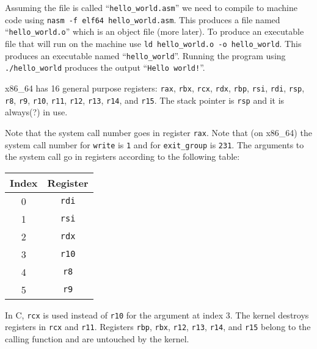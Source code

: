 \documentclass[12pt]{book}
\begin{document}
  Assuming the file is called ``\texttt{hello_world.asm}'' we need
  to compile to machine code using
  \texttt{nasm -f elf64 hello_world.asm}. This produces a file
  named ``\texttt{hello_world.o}'' which is an object file (more
  later). To produce an executable file that will run on the machine use
  \texttt{ld hello_world.o -o hello_world}. This produces an
  executable named ``\texttt{hello_world}''. Running the program
  using \texttt{./hello_world} produces the output
  ``\texttt{Hello world!}''.

  x86\_64 has 16 general purpose registers: \texttt{rax},
  \texttt{rbx}, \texttt{rcx}, \texttt{rdx},
  \texttt{rbp}, \texttt{rsi}, \texttt{rdi},
  \texttt{rsp}, \texttt{r8}, \texttt{r9},
  \texttt{r10}, \texttt{r11}, \texttt{r12},
  \texttt{r13}, \texttt{r14}, and \texttt{r15}. The
  stack pointer is \texttt{rsp} and it is always(?) in use.

  Note that the system call number goes in register \texttt{rax}. Note
  that (on x86\_64) the system call number for \texttt{write} is
  \texttt{1} and for \texttt{exit_group} is \texttt{231}. The arguments
  to the system call go in registers according to the following table:

  {\ttfamily\begin{tabular}{c c}
    \hline
    Index & Register \\
    \hline
    0 & \texttt{rdi} \\
    1 & \texttt{rsi} \\
    2 & \texttt{rdx} \\
    3 & \texttt{r10} \\
    4 & \texttt{r8} \\
    5 & \texttt{r9} \\
  \end{tabular}}

  In C, \texttt{rcx} is used instead of \texttt{r10} for
  the argument at index 3. The kernel destroys registers in
  \texttt{rcx} and \texttt{r11}. Registers
  \texttt{rbp}, \texttt{rbx}, \texttt{r12},
  \texttt{r13}, \texttt{r14}, and \texttt{r15} belong
  to the calling function and are untouched by the kernel.
\end{document}
